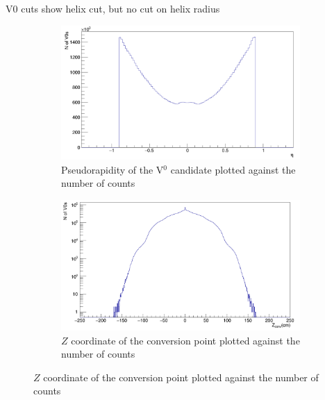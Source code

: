 V0 cuts
show helix cut, but no cut on helix radius

\begin{figure}
\centering
\begin{subfigure}[h]{.4\linewidth}
\includegraphics[width=1.0\linewidth]{Figures/V0cuts/V0eta.png}
\caption{Pseudorapidity of the V$^0$ candidate plotted against the number of counts}
\label{fig:V0eta}
\end{subfigure}\hspace{1cm}%
\begin{subfigure}[h]{.4\linewidth}
\includegraphics[width=1.0\linewidth]{Figures/V0cuts/V0Z.png}
\caption{$Z$ coordinate of the conversion point plotted against the number of counts}
\label{fig:V0Z}
\end{subfigure}

\vspace{0.7cm}


\end{figure}

